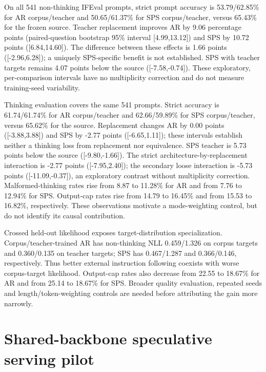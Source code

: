 On all 541 non-thinking IFEval prompts, strict prompt accuracy is 53.79/62.85\% for AR corpus/teacher and 50.65/61.37\% for SPS corpus/teacher, versus 65.43\% for the frozen source. Teacher replacement improves AR by 9.06 percentage points (paired-question bootstrap 95\% interval [4.99,13.12]) and SPS by 10.72 points ([6.84,14.60]). The difference between these effects is 1.66 points ([-2.96,6.28]); a uniquely SPS-specific benefit is not established. SPS with teacher targets remains 4.07 points below the source ([-7.58,-0.74]). These exploratory, per-comparison intervals have no multiplicity correction and do not measure training-seed variability.

Thinking evaluation covers the same 541 prompts. Strict accuracy is 61.74/61.74\% for AR corpus/teacher and 62.66/59.89\% for SPS corpus/teacher, versus 65.62\% for the source. Replacement changes AR by 0.00 points ([-3.88,3.88]) and SPS by -2.77 points ([-6.65,1.11]); these intervals establish neither a thinking loss from replacement nor equivalence. SPS teacher is 5.73 points below the source ([-9.80,-1.66]). The strict architecture-by-replacement interaction is -2.77 points ([-7.95,2.40]); the secondary loose interaction is -5.73 points ([-11.09,-0.37]), an exploratory contrast without multiplicity correction. Malformed-thinking rates rise from 8.87 to 11.28\% for AR and from 7.76 to 12.94\% for SPS. Output-cap rates rise from 14.79 to 16.45\% and from 15.53 to 16.82\%, respectively. These observations motivate a mode-weighting control, but do not identify its causal contribution.

Crossed held-out likelihood exposes target-distribution specialization. Corpus/teacher-trained AR has non-thinking NLL 0.459/1.326 on corpus targets and 0.360/0.135 on teacher targets; SPS has 0.467/1.287 and 0.366/0.146, respectively. Thus better external instruction following coexists with worse corpus-target likelihood. Output-cap rates also decrease from 22.55 to 18.67\% for AR and from 25.14 to 18.67\% for SPS. Broader quality evaluation, repeated seeds and length/token-weighting controls are needed before attributing the gain more narrowly.

\section{Shared-backbone speculative serving pilot}\label{app:serving}

